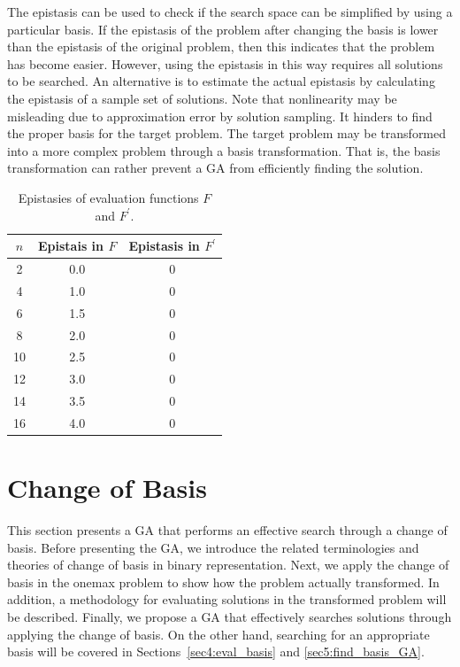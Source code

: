 The epistasis can be used to check if the search space can be simplified by using a particular basis. If the epistasis of the problem after changing the basis is lower than the epistasis of the original problem, then this indicates that the problem has become easier. However, using the epistasis in this way requires all solutions to be searched. An alternative is to estimate the actual epistasis by calculating the epistasis of a sample set of solutions.
Note that nonlinearity may be misleading due to approximation error by solution sampling. It hinders to find the proper basis for the target problem. The target problem may be transformed into a more complex problem through a basis transformation. That is, the basis transformation can rather prevent a GA from efficiently finding the solution.

\begin{table}[H]
	\caption{Epistasies of evaluation functions $ F $ and $ F^\prime $.} \label{tab:epi_func}
	\vspace*{0.2cm}
	\centering
	\begin{tabular}{ccc}
		\toprule
		$ n $ & Epistais in $ F $ & Epistasis in $ F^\prime $   \\ 
		\midrule
		2 &  0.0 & 0   \\
		4 &  1.0 &  0  \\
		6 &  1.5 & 0  \\
		8 &  2.0 & 0  \\
		10&  2.5 & 0  \\
		12&  3.0 & 0  \\
		14&  3.5 & 0  \\
		16&  4.0 & 0\\
		\bottomrule
	\end{tabular}
\end{table}

\section{Change of Basis} \label{sec3:cob}
This section presents a GA that performs an effective search through a change of basis. Before presenting the GA, we introduce the related terminologies and theories of change of basis in binary representation.
Next, we apply the change of basis in the onemax problem to show how the problem actually transformed. In addition, a methodology for evaluating solutions in the transformed problem will be described.
Finally, we propose a GA that effectively searches solutions through applying the change of basis.
On the other hand, searching for an appropriate basis will be covered in Sections~\ref{sec4:eval_basis} and \ref{sec5:find_basis_GA}.

